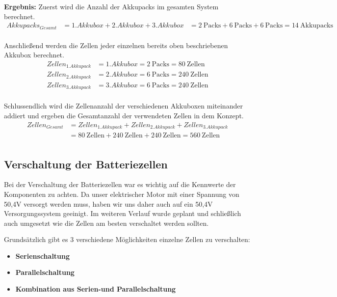 \textbf{Ergebnis:}
Zuerst wird die Anzahl der  Akkupacks im gesamten System berechnet.
\begin{align*}
Akkupacks_{Gesamt} &= 1. Akkubox + 2. Akkubox + 3. Akkubox &=  2~\mathrm{Packs} + 6~\mathrm{Packs} + 6~\mathrm{Packs} = 14~\mathrm{Akkupacks}\\
\end{align*}

Anschließend werden die Zellen jeder einzelnen bereits oben beschriebenen Akkubox berechnet.
\begin{align*}
Zellen_{1.Akkupack} &= 1. Akkubox = 2~\mathrm{Packs} = 80~\mathrm{Zellen}\\
Zellen_{2.Akkupack} &= 2. Akkubox = 6~\mathrm{Packs} = 240~\mathrm{Zellen}\\
Zellen_{3.Akkupack} &= 3. Akkubox = 6~\mathrm{Packs} = 240~\mathrm{Zellen}\\
\end{align*}

Schlussendlich wird die Zellenanzahl der verschiedenen Akkuboxen miteinander addiert und ergeben die Gesamtanzahl der verwendeten Zellen in dem Konzept.
\begin{align*}
Zellen_{Gesamt} &= Zellen_{1.Akkupack} + Zellen_{2.Akkupack} + Zellen_{3.Akkupack}\\ &= 80~\mathrm{Zellen} + 240~\mathrm{Zellen} + 240~\mathrm{Zellen} = 560~\mathrm{Zellen}\\
\end{align*}
\newpage

\subsection{Verschaltung der Batteriezellen}

Bei der Verschaltung der Batteriezellen war es wichtig auf die Kennwerte der Komponenten zu achten. Da unser elektrischer Motor mit einer Spannung von 50,4V versorgt werden muss, haben wir uns daher auch auf ein 50,4V Versorgungssystem geeinigt. Im weiteren Verlauf wurde geplant und schließlich auch umgesetzt wie die Zellen am besten verschaltet werden sollten.

Grundsätzlich gibt es 3 verschiedene Möglichkeiten einzelne Zellen zu verschalten:

\begin{itemize}
\item \textbf{Serienschaltung} 
\item \textbf{Parallelschaltung}
\item \textbf{Kombination aus Serien-und Parallelschaltung}
\end{itemize}

